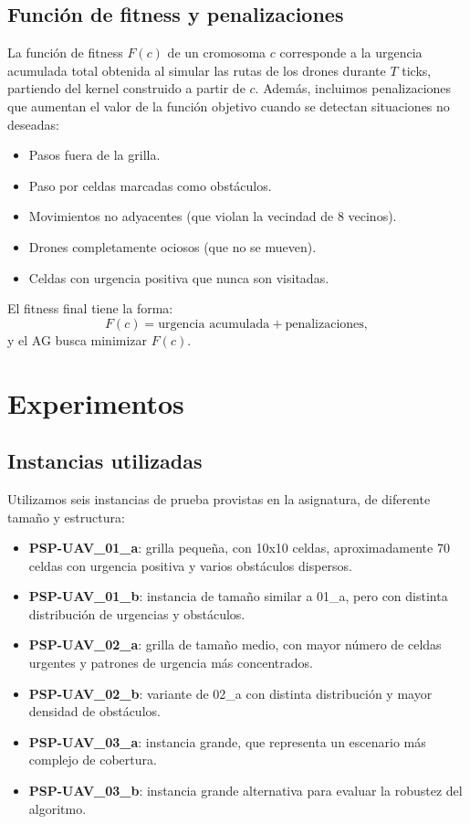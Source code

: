 \documentclass[11pt,a4paper]{article}
\begin{document}
\subsection{Función de fitness y penalizaciones}

La función de fitness $F(c)$ de un cromosoma $c$ corresponde a la urgencia acumulada total obtenida al simular las rutas de los drones durante $T$ ticks, partiendo del kernel construido a partir de $c$. Además, incluimos penalizaciones que aumentan el valor de la función objetivo cuando se detectan situaciones no deseadas:
\begin{itemize}
    \item Pasos fuera de la grilla.
    \item Paso por celdas marcadas como obstáculos.
    \item Movimientos no adyacentes (que violan la vecindad de 8 vecinos).
    \item Drones completamente ociosos (que no se mueven).
    \item Celdas con urgencia positiva que nunca son visitadas.
\end{itemize}
El fitness final tiene la forma:
\[
    F(c) = \text{urgencia acumulada} + \text{penalizaciones},
\]
y el AG busca minimizar $F(c)$.



\section{Experimentos}
\label{sec:experimentos}

\subsection{Instancias utilizadas}

Utilizamos seis instancias de prueba provistas en la asignatura, de diferente tamaño y estructura:

\begin{itemize}
    \item \textbf{PSP-UAV\_01\_a}: grilla pequeña, con 10x10 celdas, aproximadamente 70 celdas con urgencia positiva y varios obstáculos dispersos.
    \item \textbf{PSP-UAV\_01\_b}: instancia de tamaño similar a 01\_a, pero con distinta distribución de urgencias y obstáculos.
    \item \textbf{PSP-UAV\_02\_a}: grilla de tamaño medio, con mayor número de celdas urgentes y patrones de urgencia más concentrados.
    \item \textbf{PSP-UAV\_02\_b}: variante de 02\_a con distinta distribución y mayor densidad de obstáculos.
    \item \textbf{PSP-UAV\_03\_a}: instancia grande, que representa un escenario más complejo de cobertura.
    \item \textbf{PSP-UAV\_03\_b}: instancia grande alternativa para evaluar la robustez del algoritmo.
\end{itemize}
\end{document}
